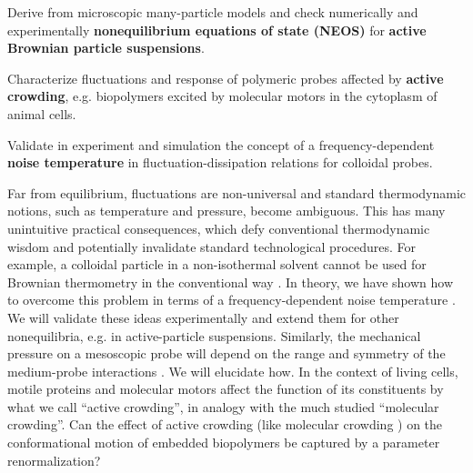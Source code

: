 \begin{workpackage}[id=WPactive,wphases=0-48,
  short=Active Particle Suspensions,%
  title=Probing active particle suspensions with colloids and polymers,
  lead=ULEI,
  ULEIRM=96,UNIPDRM=6,USTUTTRM=6,KULRM=6]

\newrefsection

\begin{mdframed}
\mobjectives
%
  \begin{compactitem}
  \item Derive from microscopic many-particle models and check numerically and experimentally 
  \textbf{nonequilibrium equations of state (NEOS)} for  \textbf{active Brownian particle suspensions}.
  \item Characterize fluctuations and response of polymeric probes affected by \textbf{active
    crowding}, e.g. biopolymers excited by molecular motors in the cytoplasm of animal cells.
  \item Validate in experiment and simulation the concept of a frequency-dependent \textbf{noise temperature} 
  in fluctuation-dissipation relations for colloidal probes.
  \end{compactitem}

\mdescription
%
Far from equilibrium, fluctuations are non-universal and standard thermodynamic notions,
such as temperature and pressure, become ambiguous. 
This has many unintuitive practical consequences, which defy conventional thermodynamic
wisdom and potentially invalidate standard technological procedures.
%
For example, a colloidal particle in a non-isothermal solvent cannot be used for Brownian thermometry 
in the conventional way \cite{rings-etal:2010,kroy:2014}. In theory, we have shown how to overcome this problem
in terms of a frequency-dependent noise temperature \cite{falasco-etal:2014}.
%
We will validate these ideas experimentally and extend them for other
nonequilibria, e.g. in active-particle suspensions.
%
Similarly, the mechanical pressure on a mesoscopic probe will depend on the range and symmetry 
of the medium-probe interactions \cite{solon-etal:2015}. We will elucidate how. 
%
In the context of living cells, motile proteins and molecular motors affect the function
of its constituents by what  we call ``active crowding'', in analogy with the much studied ``molecular crowding''.
%
Can the effect of active crowding (like molecular crowding \cite{schoebl-etal:2014}) on the conformational motion 
of embedded biopolymers be captured by a parameter renormalization?  
\end{mdframed}


\end{workpackage}
